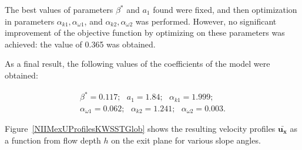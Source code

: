 \documentclass[mathematics,article,submit,pdftex,moreauthors]{Definitions/mdpi}
\begin{document}
The best values of parameters $\beta^*$ and $a_1$ found were fixed, and then optimization in parameters $\alpha_{k1}, \alpha_{\omega1}$, and $\alpha_{k2}, \alpha_{\omega2}$ was performed. 
However, no significant improvement of the objective function by optimizing on these parameters was achieved: the value of 0.365 was obtained.


%
%

As a final result, the following values of the coefficients of the model were obtained:

\begin{linenomath}
\begin{equation}
	\begin{aligned}
		\beta^* = 0.117;\ \ \ a_1 = 1.84;\ \ \ \alpha_{k 1} = 1.999;\\
		\alpha_{\omega 1} = 0.062; \ \ \ \alpha_{k 2} = 1.241;\ \ \ \alpha_{\omega 2} = 0.003.
	\end{aligned}
\end{equation}
\end{linenomath}

Figure~\ref{NIIMexUProfilesKWSSTGlob} shows the resulting velocity profiles $\bar{\boldsymbol{u_x}}$ as a function from flow depth $h$ on the exit plane for various slope angles.
\end{document}
